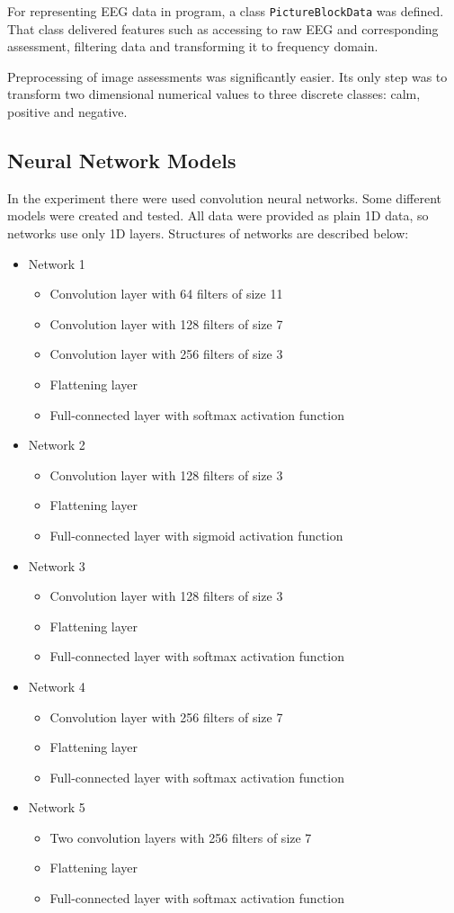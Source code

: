 \documentclass[10pt,journal,compsoc]{IEEEtran}
\begin{document}
For representing EEG data in program, a class \texttt{PictureBlockData} was defined. That class delivered features such as accessing to raw EEG and corresponding assessment, filtering data and transforming it to frequency domain.

Preprocessing of image assessments was significantly easier. Its only step was to transform two dimensional numerical values to three discrete classes: calm, positive and negative.

\subsection{Neural Network Models}
In the experiment there were used convolution neural networks. Some different models were created and tested. All data were provided as plain 1D data, so networks use only 1D layers. Structures of networks are described below:
\begin{itemize}
\item{Network 1}
\begin{itemize}
\item{Convolution layer with 64 filters of size 11}
\item{Convolution layer with 128 filters of size 7}
\item{Convolution layer with 256 filters of size 3}
\item{Flattening layer}
\item{Full-connected layer with softmax activation function}
\end{itemize}
\item{Network 2}
\begin{itemize}
\item{Convolution layer with 128 filters of size 3}
\item{Flattening layer}
\item{Full-connected layer with sigmoid activation function}
\end{itemize}
\item{Network 3}
\begin{itemize}
\item{Convolution layer with 128 filters of size 3}
\item{Flattening layer}
\item{Full-connected layer with softmax activation function}
\end{itemize}
\item{Network 4}
\begin{itemize}
\item{Convolution layer with 256 filters of size 7}
\item{Flattening layer}
\item{Full-connected layer with softmax activation function}
\end{itemize}
\item{Network 5}
\begin{itemize}
\item{Two convolution layers with 256 filters of size 7}
\item{Flattening layer}
\item{Full-connected layer with softmax activation function}
\end{itemize}
\end{itemize}
\end{document}

